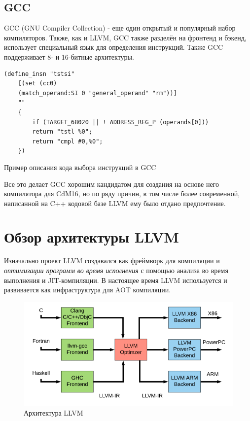 \documentclass[a4paper,14pt]{extarticle}
\begin{document}
\subsection{GCC}
GCC (GNU Compiler Collection) - еще один открытый и популярный набор компиляторов. Также, как и LLVM, GCC также разделён на фронтенд и бэкенд, использует специальный язык для определения инструкций. Также GCC поддерживает 8- и 16-битные архитектуры.
\begin{listing}[h!]
	\begin{verbatim}
(define_insn "tstsi"
	[(set (cc0)
	(match_operand:SI 0 "general_operand" "rm"))]
	""
	{
		if (TARGET_68020 || ! ADDRESS_REG_P (operands[0]))
		return "tstl %0";
		return "cmpl #0,%0";
	})
	\end{verbatim}
	\caption{Пример описания кода выбора инструкций в GCC\cite{gcc:codegen}}
\end{listing}
Все это делает GCC хорошим кандидатом для создания на основе него компилятора для CdM16, но по ряду причин, в том числе более современной, написанной на C++ кодовой базе LLVM ему было отдано предпочтение.

\pagebreak
\section{Обзор архитектуры LLVM}

Изначально проект LLVM создавался как фреймворк для компиляции и \emph{оптимизации программ во время исполнения} с помощью анализа во время выполнения и JIT-компиляции\cite{LLVM:CGO04}. В настоящее время LLVM используется и развивается как инфраструктура для AOT компиляции.
\begin{figure}[!h]
	\begin{center}
		\includegraphics[width=\textwidth]{LLVM-Compiler-Development-architecture.png}
		\caption{Архитектура LLVM \cite{llvmpic}}
	\end{center}
\end{figure}
\end{document}
